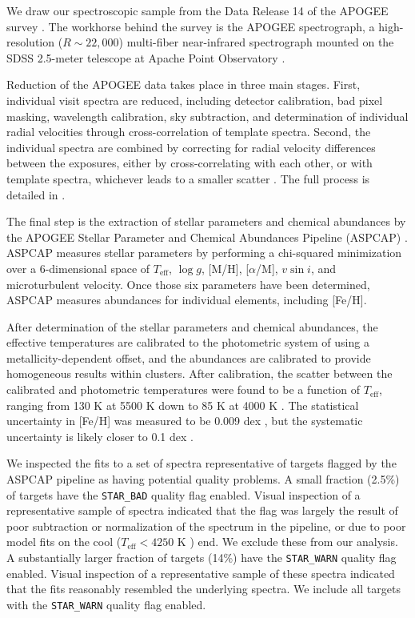 \documentclass[twocolumn]{aastex6}
\newcommand{\vsini}{\ensuremath{v \sin i}}
\newcommand{\Teff}{\ensuremath{T_{\textrm{eff}}}}
\newcommand{\logg}{\ensuremath{\log g}}
\newcommand{\feh}{\textrm{[Fe/H]}}
\newcommand{\STARBAD}{\texttt{STAR\_BAD}}
\newcommand{\STARWARN}{\texttt{STAR\_WARN}}
\begin{document}
We draw our spectroscopic sample from the Data Release 14 \citep{Abolfathi18}
of the APOGEE survey \citep{Majewski17}. The workhorse behind the survey is the
APOGEE spectrograph, a high-resolution (\(R \sim 22,000\)) multi-fiber
near-infrared spectrograph \citep{Wilson10} mounted on the SDSS 2.5-meter
telescope at Apache Point Observatory \citep{Gunn06}.

Reduction of the APOGEE data takes place in three main stages. First,
individual visit spectra are reduced, including detector calibration, bad pixel
masking, wavelength calibration, sky subtraction, and determination of
individual radial velocities through cross-correlation of template spectra.
Second, the individual spectra are combined by correcting for radial velocity
differences between the exposures, either by cross-correlating with each other,
or with template spectra, whichever leads to a smaller scatter
\citep{Holtzman18}. The full process is detailed in \citet{Nidever15}.

The final step is the extraction of stellar parameters and chemical abundances
by the APOGEE Stellar Parameter and Chemical Abundances Pipeline (ASPCAP)
\citep{GarciaPerez16}. ASPCAP measures stellar parameters by performing a
chi-squared minimization \citep{AllendePrieto06} over a 6-dimensional space of
\Teff, \logg, [M/H], [\(\alpha\)/M], \vsini, and microturbulent velocity. Once
those six parameters have been determined, ASPCAP measures abundances for
individual elements, including \feh{}.

After determination of the stellar parameters and chemical abundances, the 
effective temperatures are calibrated to the photometric system of \citet{GonzalezHernandez09} using a 
metallicity-dependent offset, and the abundances are calibrated to provide
homogeneous results within clusters. After calibration, the scatter between the 
calibrated and photometric temperatures  were found to be a function of 
\Teff{}, ranging from 130 K at 5500 K down to 85 K at 4000 K
\citep{Holtzman18}. The statistical uncertainty in \feh{} was measured to be 
0.009 dex \citep{Holtzman18}, but the systematic uncertainty is likely closer
to 0.1 dex \citep{Serenelli17}.

We inspected the fits to a set of spectra representative of targets flagged 
by the ASPCAP pipeline as having potential quality problems. A small fraction
(2.5\%) of targets have the \STARBAD{} quality flag enabled. Visual inspection
of a representative sample of spectra indicated that the flag was largely the
result of poor subtraction or normalization of the spectrum in the pipeline, or
due to poor model fits on the cool (\(\Teff < 4250 \textrm{ K }\)) end. We exclude these
from our analysis. A substantially larger fraction of targets (14\%) have the 
\STARWARN{} quality flag enabled. Visual inspection of a representative sample 
of these spectra indicated that the fits reasonably resembled the underlying 
spectra. We include all targets with the \STARWARN{} quality flag enabled.
\end{document}
